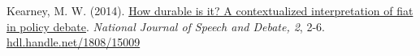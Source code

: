 \begin{bibenum}
\item Kearney, M. W. (2014). \href{http://ssrn.com/abstract=2618298}{
	How durable is it? A contextualized interpretation of fiat in policy debate}.
	\textit{National Journal of Speech and Debate, 2}, 2-6.
	\href{http://hdl.handle.net/1808/15009}{hdl.handle.net/1808/15009}

\end{bibenum}


